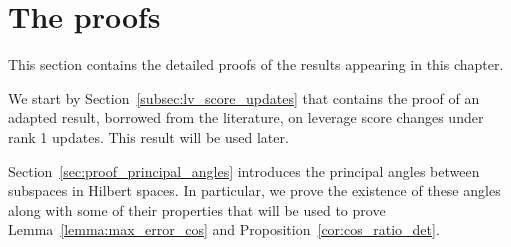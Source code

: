 \documentclass[twoside,11pt]{book}
\newtheorem{proposition}{Proposition}
\numberwithin{theorem}{chapter}
\numberwithin{definition}{chapter}
\numberwithin{proposition}{chapter}
\numberwithin{corollary}{chapter}
\numberwithin{example}{chapter}
\numberwithin{lemma}{chapter}
\numberwithin{assumption}{chapter}
\numberwithin{equation}{chapter}
\numberwithin{figure}{chapter}
\DeclareMathOperator{\Det}{Det}
\DeclareMathOperator{\DPP}{\mathrm{DPP}}
\DeclareMathOperator{\EX}{\mathbb{E}}
\begin{document}





\section{The proofs}
\label{s:proofs}
This section contains the detailed proofs of the results appearing in this chapter. 

We start by Section~\ref{subsec:lv_score_updates} that  contains the proof of an adapted result, borrowed from the literature, on leverage score changes under rank 1 updates. This result will be used later.

Section~\ref{sec:proof_principal_angles}  introduces the principal angles between subspaces in Hilbert spaces. In particular, we prove the existence of these angles along with some of their properties that will be used to prove Lemma~\ref{lemma:max_error_cos} and Proposition~\ref{cor:cos_ratio_det}.
\end{document}
